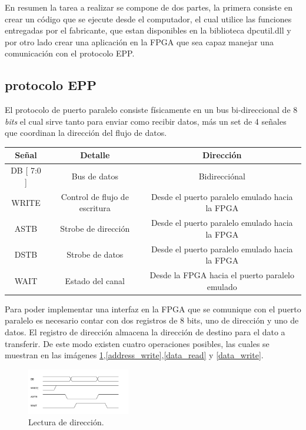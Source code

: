 \documentclass[11pt,letterpaper,spanish]{article}
\begin{document}
En resumen la tarea a realizar se compone de dos partes, la primera consiste en crear un código que se ejecute desde el computador, el cual utilice las funciones entregadas por el fabricante, que estan disponibles en la biblioteca dpcutil.dll y por otro lado crear una aplicación en la FPGA que sea capaz manejar una comunicación con el protocolo EPP.

\subsection{protocolo EPP}
El protocolo de puerto paralelo consiste físicamente en un bus bi-direccional de 8 \textit{bits} el cual sirve tanto para enviar como recibir datos, más un set de 4 señales que coordinan la dirección del flujo de datos. 


\begin{tabular}{|c|c|c|}
\hline
Señal& Detalle& Dirección \\
\hline
DB [ 7:0 ]  & Bus de datos & Bidirecciónal \\ 
\hline 
WRITE & Control de flujo de escritura & Desde el puerto paralelo emulado hacia la FPGA \\ 
\hline 
ASTB & Strobe de dirección &Desde el puerto paralelo emulado hacia la FPGA \\ 
\hline 
DSTB & Strobe de datos & Desde el puerto paralelo emulado hacia la FPGA \\ 
\hline 
WAIT & Estado del canal & Desde la FPGA hacia el puerto paralelo emulado \\ 
\hline 
\end{tabular} 
\hfill \break



Para poder implementar una interfaz en la FPGA que se comunique con el puerto paralelo es necesario contar con dos registros de 8 bits, uno de dirección y uno de datos. El registro de dirección almacena la dirección de destino para el dato a transferir. De este modo existen cuatro operaciones posibles, las cuales se muestran en las imágenes \ref{addres_read},\ref{address_write},\ref{data_read} y \ref{data_write}.


	\begin{figure}[h!]
	\begin{center}
	\includegraphics[width=0.4\textwidth]{figuras/address_read.png} 
	\caption{\label{addres_read} Lectura de dirección.}
	\end{center}
	\end{figure}
\end{document}
